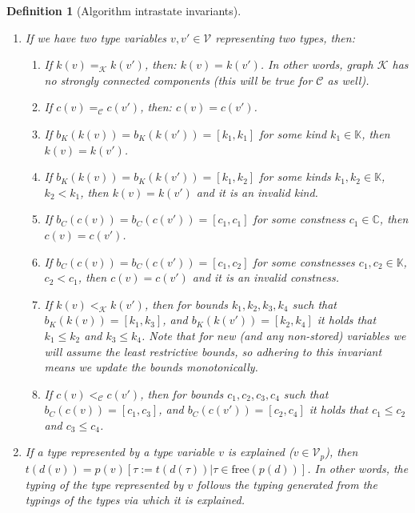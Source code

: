 \documentclass[12pt,a4paper]{article}
\newtheorem{definition}{Definition}
\begin{document}
\begin{definition}[Algorithm intrastate invariants]
\begin{enumerate}
        \item \label{invG} If we have two type variables $v, v' \in \mathcal{V}$ representing two types, then:
            \begin{enumerate}
                \item If $k (v) =_\mathcal{K} k (v')$, then: $k (v) = k(v')$. In other words, graph $\mathcal{K}$ has no strongly connected components (this will be true for $\mathcal{C}$ as well).
                \item If $c (v) =_\mathcal{C} c (v')$, then: $c (v) = c(v')$.
                \item If $b_K (k (v)) = b_K (k (v')) = [k_1, k_1]$ for some kind $k_1 \in \mathbb{K}$, then $k (v) = k (v')$.
                \item If $b_K (k (v)) = b_K (k (v')) = [k_1, k_2]$ for some kinds $k_1, k_2 \in \mathbb{K}$, $k_2 < k_1$, then $k (v) = k (v')$ and it is an invalid kind.
                \item If $b_C (c (v)) = b_C (c (v')) = [c_1, c_1]$ for some constness $c_1 \in \mathbb{C}$, then $c (v) = c (v')$.
                \item If $b_C (c (v)) = b_C (c (v')) = [c_1, c_2]$ for some constnesses $c_1, c_2 \in \mathbb{K}$, $c_2 < c_1$, then $c (v) = c (v')$ and it is an invalid constness.
                \item If $k (v) <_\mathcal{K} k (v')$, then for bounds $k_1, k_2, k_3, k_4$ such that $b_K (k (v)) = [k_1, k_3]$, and $b_K (k (v')) = [k_2, k_4]$ it holds that $k_1 \leq k_2$ and $k_3 \leq k_4$. Note that for new (and any non-stored) variables we will assume the least restrictive bounds, so adhering to this invariant means we update the bounds monotonically.
                \item If $c (v) <_\mathcal{C} c (v')$, then for bounds $c_1, c_2, c_3, c_4$ such that $b_C (c (v)) = [c_1, c_3]$, and $b_C (c (v')) = [c_2, c_4]$ it holds that $c_1 \leq c_2$ and $c_3 \leq c_4$.
            \end{enumerate}

        \item If a type represented by a type variable $v$ is explained ($v \in \mathcal{V}_p$), then $t (d (v)) = p(v) \left[ \tau := t (d (\tau)) | \tau \in \mathrm{free} (p (d))\right]$. In other words, the typing of the type represented by $v$ follows the typing generated from the typings of the types via which it is explained. \label{invT}
    \end{enumerate}
\end{definition}
\end{document}
